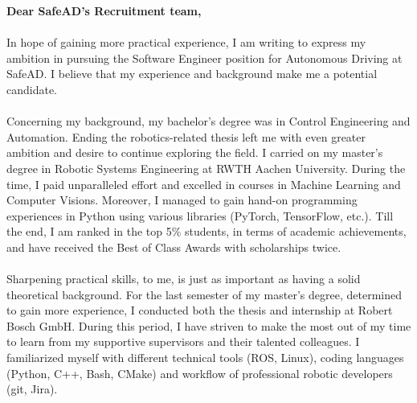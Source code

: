 \documentclass[
10pt, A4, english,
draft = false,
twoside = false,
]{article}
\begin{document}
	\onehalfspacing
	{\fontsize{14}{0}\selectfont		
		\textbf{Dear SafeAD's Recruitment team,}\\~\\
		In hope of gaining more practical experience, I am writing to express my ambition in pursuing the Software Engineer position for Autonomous Driving at SafeAD. I believe that my experience and background make me a potential candidate.\\~\\
		Concerning my background, my bachelor's degree was in Control Engineering and Automation. Ending the robotics-related thesis left me with even greater ambition and desire to continue exploring the field. I carried on my master’s degree in Robotic Systems Engineering at RWTH Aachen University. During the time, I paid unparalleled effort and excelled in courses in Machine Learning and Computer Visions. Moreover, I managed to gain hand-on programming experiences in Python using various libraries (PyTorch, TensorFlow, etc.). Till the end, I am ranked in the top 5\% students, in terms of academic achievements, and have received the Best of Class Awards with scholarships twice.\\~\\
		Sharpening practical skills, to me, is just as important as having a solid theoretical background. For the last semester of my master’s degree, determined to gain more experience, I conducted both the thesis and internship at Robert Bosch GmbH. During this period, I have striven to make the most out of my time to learn from my supportive supervisors and their talented colleagues. I familiarized myself with different technical tools (ROS, Linux), coding languages (Python, C++, Bash, CMake) and workflow of professional robotic developers (git, Jira).\\~\\
}
\end{document}

